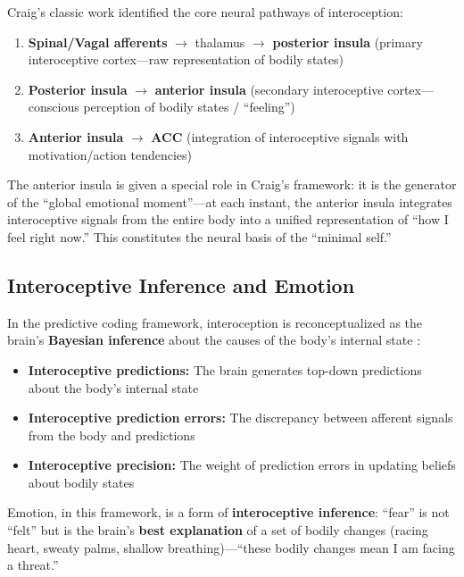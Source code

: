 \documentclass[11pt,a4paper]{article}
\begin{document}
Craig's \cite{Craig2002,Craig2009} classic work identified the core neural pathways of interoception:

\begin{enumerate}[nosep]
    \item \textbf{Spinal/Vagal afferents} $\rightarrow$ thalamus $\rightarrow$ \textbf{posterior insula} (primary interoceptive cortex---raw representation of bodily states)
    \item \textbf{Posterior insula} $\rightarrow$ \textbf{anterior insula} (secondary interoceptive cortex---conscious perception of bodily states / ``feeling'')
    \item \textbf{Anterior insula} $\rightarrow$ \textbf{ACC} (integration of interoceptive signals with motivation/action tendencies)
\end{enumerate}

The anterior insula is given a special role in Craig's framework: it is the generator of the ``global emotional moment''---at each instant, the anterior insula integrates interoceptive signals from the entire body into a unified representation of ``how I feel right now.'' This constitutes the neural basis of the ``minimal self.''

\subsection{Interoceptive Inference and Emotion}

In the predictive coding framework, interoception is reconceptualized as the brain's \textbf{Bayesian inference} about the causes of the body's internal state \cite{Seth2013}:

\begin{itemize}[nosep]
    \item \textbf{Interoceptive predictions:} The brain generates top-down predictions about the body's internal state
    \item \textbf{Interoceptive prediction errors:} The discrepancy between afferent signals from the body and predictions
    \item \textbf{Interoceptive precision:} The weight of prediction errors in updating beliefs about bodily states
\end{itemize}

Emotion, in this framework, is a form of \textbf{interoceptive inference}: ``fear'' is not ``felt'' but is the brain's \textbf{best explanation} of a set of bodily changes (racing heart, sweaty palms, shallow breathing)---``these bodily changes mean I am facing a threat.''
\end{document}
